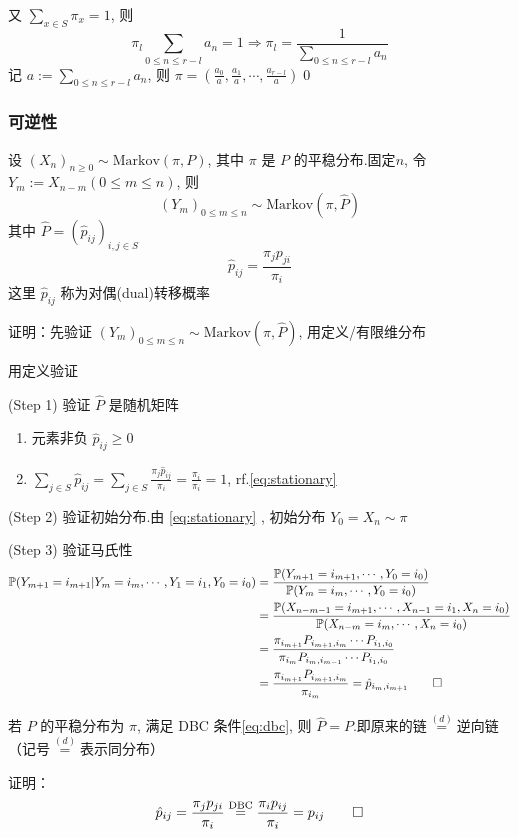 又 $\sum_{x\in S}\pi_x=1$, 则
\[
\pi_l\sum_{0\leq n\leq r-l}a_n=1\Rightarrow \pi_l=\frac{1}{\sum_{0\leq n\leq r-l}a_n}
\]
记 $a:=\sum_{0\leq n\leq r-l}a_n$, 则 $\pi=(\frac{a_0}{a},\frac{a_1}{a},\cdots,\frac{a_{r-l}}{a})$\qed

\subsubsection{可逆性}

\begin{theorem}
    设 $(X_n)_{n\geq 0}\sim \text{Markov}(\pi,P)$, 其中 $\pi$ 是 $P$ 的平稳分布.固定$n$, 令 $Y_m:=X_{n-m}(0\leq m\leq n)$, 则
    \[
    (Y_m)_{0\leq m\leq n}\sim\text{Markov}(\pi,\hat{P})
    \]
    其中 $\hat{P}=(\hat{p}_{ij})_{i,j\in S}$
    \[
    \hat{p}_{ij}=\frac{\pi_j p_{ji}}{\pi_i}
    \]
    这里 $\hat{p}_{ij}$ 称为对偶(dual)转移概率
\end{theorem}

证明：先验证 $(Y_m)_{0\leq m\leq n}\sim \text{Markov}(\pi,\hat{P})$, 用定义/有限维分布

用定义验证

(Step 1) 验证 $\hat{P}$ 是随机矩阵
\begin{enumerate}
    \item 元素非负 $\hat{p}_{ij}\geq 0$
    \item $\sum_{j\in S}\hat{p}_{ij}=\sum_{j\in S}\frac{\pi_j\hat{p}_{ij}}{\pi_i}=\frac{\pi_i}{\pi_i}=1$, rf.\eqref{eq:stationary}
\end{enumerate}

(Step 2) 验证初始分布.由 \eqref{eq:stationary} , 初始分布 $Y_0=X_n\sim \pi$

(Step 3) 验证马氏性
\[
\begin{aligned}
    \mathbb{P}(Y_{m+1}=i_{m+1}|Y_m=i_m,\cdots,Y_1=i_1,Y_0=i_0)&=\frac{\mathbb{P}(Y_{m+1}=i_{m+1},\cdots,Y_0=i_0)}{\mathbb{P}(Y_m=i_m,\cdots,Y_0=i_0)}\\
    &=\frac{\mathbb{P}(X_{n-m-1}=i_{m+1},\cdots,X_{n-1}=i_1,X_n=i_0)}{\mathbb{P}(X_{n-m}=i_m,\cdots,X_n=i_0)}\\
    &=\frac{\pi_{i_{m+1}}P_{i_{m+1},i_m}\cdots P_{i_1,i_0}}{\pi_{i_m}P_{i_m,i_{m-1}}\cdots P_{i_1,i_0}}\\
    &=\frac{\pi_{i_{m+1}}P_{i_{m+1},i_m}}{\pi_{i_m}}=\hat{p}_{i_m,i_{m+1}}\qed
\end{aligned}
\]
\begin{corollary}[可逆性]
    若 $P$ 的平稳分布为 $\pi$, 满足 DBC 条件\eqref{eq:dbc}, 则 $\hat{P}=P$.即原来的链$\overset{(d)}{=}$逆向链（记号$\overset{(d)}{=}$表示同分布）
\end{corollary}
证明：
\[
\hat{p}_{ij}=\frac{\pi_j p_{ji}}{\pi_i}\overset{\text{DBC}}{=}\frac{\pi_i p_{ij}}{\pi_i}=p_{ij}\qed
\]

